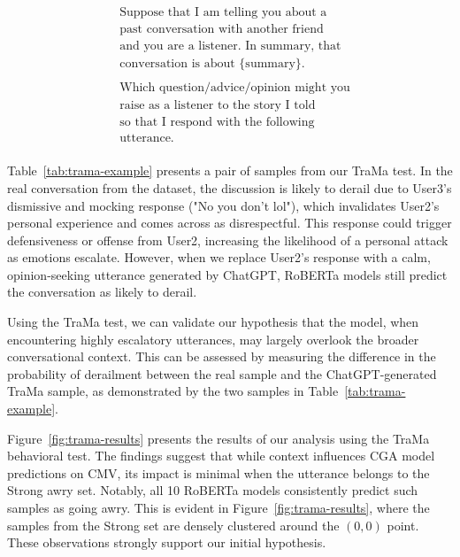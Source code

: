 {\ttfamily
\begin{align*}
& \text{Suppose that I am telling you about a}\\
& \text{past conversation with another friend}\\
& \text{and you are a listener. In summary, that}\\ 
& \text{conversation is about \{summary\}.}\\
& \\
& \text{Which question/advice/opinion might you}\\
& \text{raise as a listener to the story I told}\\ 
& \text{so that I respond with the following}\\ 
& \text{utterance.}\\ 
\end{align*}
}

Table~\ref{tab:trama-example} presents a pair of samples from our TraMa test. In the real conversation from the dataset, the discussion is likely to derail due to User3's dismissive and mocking response ("No you don't lol"), which invalidates User2's personal experience and comes across as disrespectful. This response could trigger defensiveness or offense from User2, increasing the likelihood of a personal attack as emotions escalate. However, when we replace User2's response with a calm, opinion-seeking utterance generated by ChatGPT, RoBERTa models still predict the conversation as likely to derail.



Using the TraMa test, we can validate our hypothesis that the model, when encountering highly escalatory utterances, may largely overlook the broader conversational context. This can be assessed by measuring the difference in the probability of derailment between the real sample and the ChatGPT-generated TraMa sample, as demonstrated by the two samples in Table~\ref{tab:trama-example}. 

Figure~\ref{fig:trama-results} presents the results of our analysis using the TraMa behavioral test. The findings suggest that while context influences CGA model predictions on CMV, its impact is minimal when the utterance belongs to the Strong awry set. Notably, all 10 RoBERTa models consistently predict such samples as going awry. This is evident in Figure~\ref{fig:trama-results}, where the samples from the Strong set are densely clustered around the $(0, 0)$ point. These observations strongly support our initial hypothesis.

